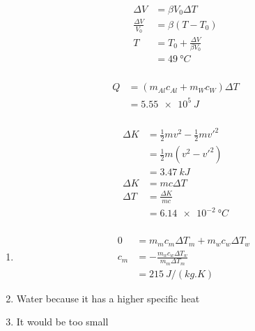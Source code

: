 \documentclass{article}
\begin{document}
\setcounter{subsubsection}{14}
\subsubsection{}

\begin{align*}
  \Delta V             & = \beta V_0 \Delta T               \\
  \frac{\Delta V}{V_0} & = \beta (T - T_0)                  \\
  T                    & = T_0 + \frac{\Delta V}{\beta V_0} \\
                       & = \qty{49}{\degree C}
\end{align*}

\setcounter{subsubsection}{24}
\subsubsection{}

\begin{align*}
  Q & = (m_{Al} c_{Al} + m_W c_W) \Delta T \\
    & = \qty{5.55e5}{J}
\end{align*}

\setcounter{subsubsection}{32}
\subsubsection{}

\begin{align*}
  \Delta K & = \frac{1}{2} m v^2 - \frac{1}{2} m v'^2 \\
           & = \frac{1}{2} m (v^2 - v'^2)             \\
           & = \qty{3.47}{kJ}                         \\
  \Delta K & = m c \Delta T                           \\
  \Delta T & = \frac{\Delta K}{m c}                   \\
           & = \qty{6.14e-2}{\degree C}
\end{align*}

\setcounter{subsubsection}{34}
\subsubsection{}

\begin{enumerate}
  \item

        \begin{align*}
          0   & = m_m c_m \Delta T_m + m_w c_w \Delta T_w    \\
          c_m & = -\frac{m_w c_w \Delta T_w}{m_m \Delta T_m} \\
              & = \qty{215}{J/(kg.K)}
        \end{align*}

  \item Water because it has a higher specific heat

  \item It would be too small
\end{enumerate}
\end{document}
